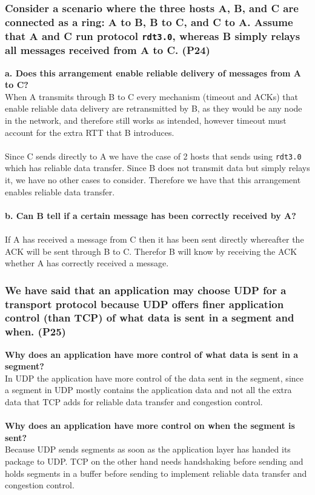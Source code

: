 \subsubsection{Consider a scenario where the three hosts A, B, and C are connected as a ring: A to B, B to C, and C to A. Assume that A and C run protocol \texttt{rdt3.0}, whereas B simply relays all messages received from A to C. (P24)}

\textbf{a. Does this arrangement enable reliable delivery of messages from A to C?} \\
When A transmits through B to C every mechanism (timeout and ACKs) that enable reliable data delivery are retransmitted by B, as they would be any node in the network, and therefore still works as intended, however timeout must account for the extra RTT that B introduces. \\
\\
Since C sends directly to A we have the case of 2 hosts that sends using \texttt{rdt3.0} which has reliable data transfer. Since B does not transmit data but simply relays it, we have no other cases to consider. Therefore we have that this arrangement enables reliable data transfer. \\
\\
\textbf{b. Can B tell if a certain message has been correctly received by A?} \\
\\
If A has received a message from C then it has been sent directly whereafter the ACK will be sent through B to C. Therefor B will know by receiving the ACK whether A has correctly received a message.



\subsubsection{We have said that an application may choose UDP for a transport protocol because UDP offers finer application control (than TCP) of what data is sent in a segment and when. (P25)}

\textbf{Why does an application have more control of what data is sent in a segment?} \\
In UDP the application have more control of the data sent in the segment, since a segment in UDP mostly contains the application data and not all the extra data that TCP adds for reliable data transfer and congestion control.\\
\\
\textbf{Why does an application have more control on when the segment is sent?} \\
Because UDP sends segments as soon as the application layer has handed its package to UDP. TCP on the other hand needs handshaking before sending and holds segments in a buffer before sending to implement reliable data transfer and congestion control.\\


